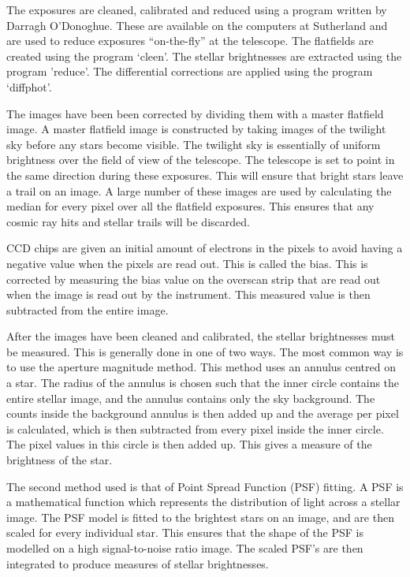 The exposures are cleaned, calibrated and reduced using a program written by Darragh O'Donoghue. These are available on the computers at Sutherland and are used to reduce exposures ``on-the-fly'' at the telescope. The flatfields are created using the program `cleen'. The stellar brightnesses are extracted using the program 'reduce'. The differential corrections are applied using the program `diffphot'.

The images have been been corrected by dividing them with a master flatfield image. A master flatfield image is constructed by taking images of the twilight sky before any stars become visible. The twilight sky is essentially of uniform brightness over the field of view of the telescope. The telescope is set to point in the same direction during these exposures. This will ensure that bright stars leave a trail on an image. A large number of these images are used by calculating the median for every pixel over all the flatfield exposures. This ensures that any cosmic ray hits and stellar trails will be discarded.

CCD chips are given an initial amount of electrons in the pixels to avoid having a negative value when the pixels are read out. This is called the bias. This is corrected by measuring the bias value on the overscan strip that are read out when the image is read out by the instrument. This measured value is then subtracted from the entire image.


After the images have been cleaned and calibrated, the stellar brightnesses must be measured. This is generally done in one of two ways. The most common way is to use the aperture magnitude method. This method uses an annulus centred on a star. The radius of the annulus is chosen such that the inner circle contains the entire stellar image, and the annulus contains only the sky background. The counts inside the background annulus is then added up and the average per pixel is calculated, which is then subtracted from every pixel inside the inner circle. The pixel values in this circle is then added up. This gives a measure of the brightness of the star.

The second method used is that of Point Spread Function (PSF) fitting. A PSF is a mathematical function which represents the distribution of light across a stellar image. The PSF model is fitted to the brightest stars on an image, and are then scaled for every individual star. This ensures that the shape of the PSF is modelled on a high signal-to-noise ratio image. The scaled PSF's are then integrated to produce measures of stellar brightnesses.

